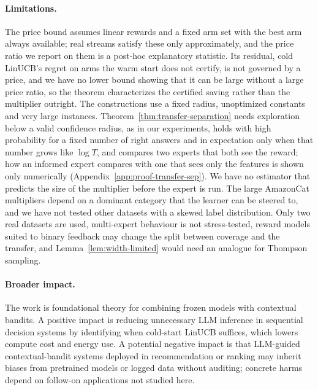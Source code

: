 \documentclass{article}
\theoremstyle{definition}
\theoremstyle{remark}
\theoremstyle{remark}
\begin{document}
\paragraph{Limitations.}
The price bound assumes linear rewards and a fixed arm set with the best arm
always available; real streams satisfy these only approximately, and the
price ratio we report on them is a post-hoc explanatory statistic. Its
residual, cold LinUCB's regret on arms the warm start does not certify, is
not governed by a price, and we have no lower bound showing that it can be
large without a large price ratio, so the theorem characterizes the
certified saving rather than the multiplier outright. The constructions use a
fixed radius, unoptimized constants and very large instances.
Theorem~\ref{thm:transfer-separation} needs exploration below a valid
confidence radius, as in our experiments, holds with high probability for a
fixed number of right answers and in expectation only when that number grows
like $\log T$, and compares two experts that both see the reward; how an informed expert
compares with one that sees only the features is shown only numerically
(Appendix~\ref{app:proof-transfer-sep}). We have no estimator that predicts
the size of the multiplier before the expert is run. The large AmazonCat
multipliers depend on a dominant category that the learner can be steered
to, and we have not tested other datasets with a skewed label distribution.
Only two real datasets are used, multi-expert behaviour is not stress-tested,
reward models suited to binary feedback may change the split between
coverage and the transfer, and Lemma~\ref{lem:width-limited} would need an
analogue for Thompson sampling.

\paragraph{Broader impact.}
The work is foundational theory for combining frozen models with contextual
bandits. A positive impact is reducing unnecessary LLM inference in
sequential decision systems by identifying when cold-start LinUCB suffices,
which lowers compute cost and energy use. A potential negative impact is that
LLM-guided contextual-bandit systems deployed in recommendation or ranking
may inherit biases from pretrained models or logged data without auditing;
concrete harms depend on follow-on applications not studied here.





\appendix
\end{document}

